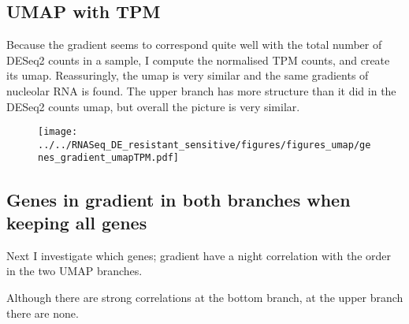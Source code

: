 \documentclass{article}
\begin{document}
\clearpage

\subsection{UMAP with TPM}
Because the gradient seems to correspond quite well with the total number of DESeq2 counts in a sample, I compute the normalised TPM counts, and create its umap. Reassuringly, the umap is very similar and the same gradients of nucleolar RNA is found. The upper branch has more structure than it did in the DESeq2 counts umap, but overall the picture is very similar.

\begin{figure}[h]
\texttt{[image: ../../RNASeq\_DE\_resistant\_sensitive/figures/figures\_umap/genes\_gradient\_umapTPM.pdf]}
\end{figure}


\subsection{Genes in gradient in both branches when keeping all genes}
Next I investigate which genes; gradient have a night correlation with the order in the two UMAP branches.

Although there are strong correlations at the bottom branch, at the upper branch there are none.
\end{document}

